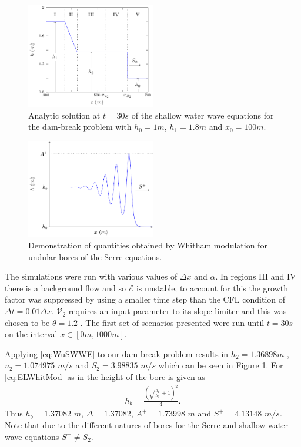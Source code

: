 \documentclass[SingleSpace,12pt,Journal]{Serre_ASCE}
\begin{document}
\begin{figure}
\centering
\includegraphics[width=0.5\textwidth]{pics/explainers/SWWEana.pdf}
\caption{Analytic solution at $t=30s$ of the shallow water wave equations for the dam-break problem with $h_0 = 1m$, $h_1=1.8m$ and $x_0=100m$.}
\label{fig:SWWEanadiagram}
\end{figure}

\begin{figure}
\centering
\includegraphics[width=0.5\textwidth]{pics/explainers/SERREex.pdf}
\caption{Demonstration of quantities obtained by Whitham modulation for undular bores of the Serre equations.}
\label{fig:Serreanadiagram}
\end{figure}
The simulations were run with various values of $\Delta x$ and $\alpha$. In regions III and IV there is a background flow and so $\mathcal{E}$ is unstable, to account for this the growth factor was suppressed by using a smaller time step than the CFL condition of $\Delta t = 0.01 \Delta x$. $\mathcal{V}_2$ requires an input parameter to its slope limiter and this was chosen to be $\theta = 1.2$ \cite{Zoppou-etal-2017}. 
The first set of scenarios presented were run until $t=30s$ on the interval $x\in[0m,1000m]$.

Applying \eqref{eq:WuSWWE} to our dam-break problem results in $h_2 = 1.36898m$ , $u_2 = 1.074975$ $m/s$ and $S_2 = 3.98835$ $m/s$ which can be seen in Figure \ref{fig:SWWEanadiagram}. For \eqref{eq:ELWhitMod} as in  the height of the bore is given as
\begin{gather*}
\label{eqn:hrdef}
h_b = \frac{\left(\sqrt{\frac{h_1}{h_0}} + 1\right)^2}{4}.
\end{gather*} 
Thus $h_b = 1.37082$ $m$, $\Delta = 1.37082$,  $A^+ = 1.73998$ $m$ and $S^+ = 4.13148$ $m/s$.
Note that due to the different natures of bores for the Serre and shallow water wave equations $S^+ \neq S_2$.
\end{document}
